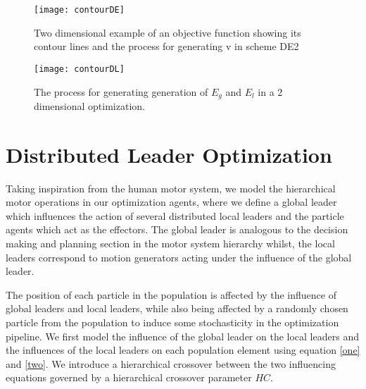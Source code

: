 \begin{figure}[h!]
  \texttt{[image: contourDE]}
  \caption{Two dimensional example of an objective function showing its contour lines and the process for
generating v in scheme DE2}
  \label{fig:contourDE}
\end{figure}

\begin{figure}[h!]
  \texttt{[image: contourDL]}
  \caption{The process for generating generation of $E_g$ and $E_l$ in a 2 dimensional optimization.}
  \label{fig:contourDL}
\end{figure}

\section{Distributed Leader Optimization}

Taking inspiration from the human motor system, we model the hierarchical motor operations in our optimization agents, where we define a global leader which influences the action of several distributed local leaders and the particle agents which act as the effectors. The global leader is analogous to the decision making and planning section in the motor system hierarchy whilst, the local leaders correspond to motion generators acting under the influence of the  global leader.

The position of each particle in the population is affected by the influence of global leaders and local leaders, while also being affected by a randomly chosen particle from the population to induce some stochasticity in the optimization pipeline. We first model the influence of the global leader on the local leaders and the influences of the local leaders  on each population element using equation \eqref{one} and \eqref{two}. We introduce a hierarchical crossover between the two influencing equations governed by a hierarchical crossover parameter $HC$.

